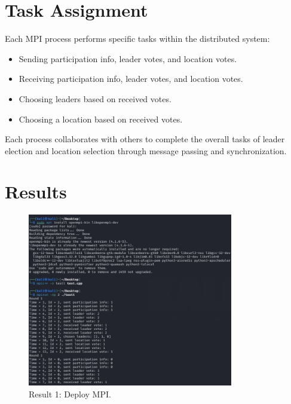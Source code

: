 \documentclass{article}
\begin{document}
\section{Task Assignment}
Each MPI process performs specific tasks within the distributed system:
\begin{itemize}
  \item Sending participation info, leader votes, and location votes.
  \item Receiving participation info, leader votes, and location votes.
  \item Choosing leaders based on received votes.
  \item Choosing a location based on received votes.
\end{itemize}
Each process collaborates with others to complete the overall tasks of leader election and location selection through message passing and synchronization.

\section{Results}
\begin{figure}[h]
  \centering
  \includegraphics[width=0.8\textwidth]{Deploy_MPI.png}
  \caption{Result 1: Deploy MPI.}
\end{figure}
\end{document}
